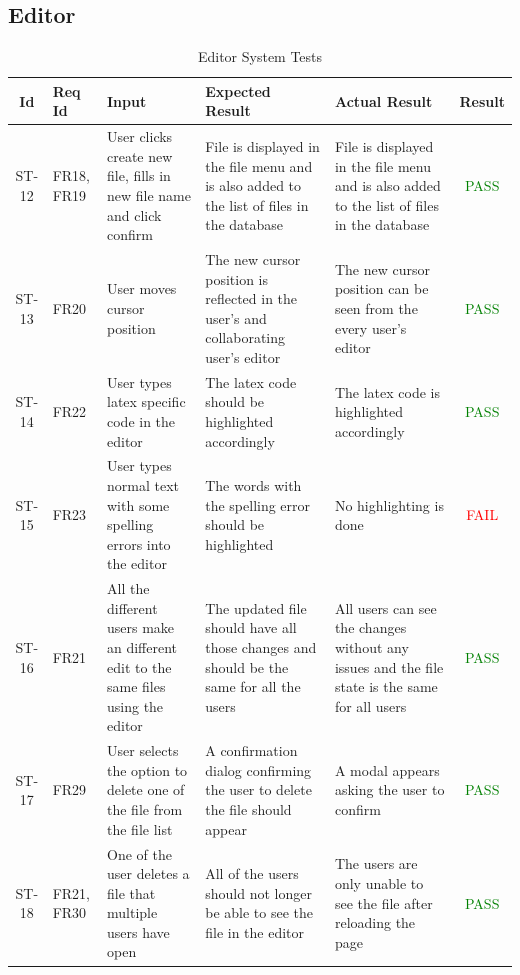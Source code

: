 \documentclass[12pt, titlepage]{article}
\begin{document}
	\subsection{Editor}
	
	\begin{center}
		\begin{longtable}{|c|p{1cm}|p{2.7cm}|p{3cm}|p{3cm}|c|}
			\caption{Editor System Tests \label{long}}\\
			\hline
			\textbf{Id} & \textbf{Req Id} & \textbf{Input} & \textbf{Expected Result} & \textbf{Actual Result} & \textbf{Result}\\
			\hline
			ST-12 & FR18, FR19 & User clicks create new file, fills in new file name and click confirm & File is displayed in the file menu and is also added to the list of files in the database &  File is displayed in the file menu and is also added to the list of files in the database &  \textcolor{green}{PASS} \\
			\hline
			ST-13 & FR20 & User moves cursor position & The new cursor position is reflected in the user's and collaborating user's editor & The new cursor position can be seen from the every user's editor &  \textcolor{green}{PASS} \\
			\hline
			ST-14 & FR22 & User types latex specific code in the editor & The latex code should be highlighted accordingly & The latex code is highlighted accordingly &  \textcolor{green}{PASS}  \\
			\hline
			ST-15 & FR23 & User types normal text with some spelling errors into the editor & The words with the spelling error should be highlighted & No highlighting is done  &  \textcolor{red}{FAIL} \\
			\hline
			ST-16 & FR21 & All the different users make an different edit to the same files using the editor & The updated file should have all those changes and should be the same for all the users & All users can see the changes without any issues and the file state is the same for all users  &  \textcolor{green}{PASS} \\
			\hline
			ST-17 & FR29 & User selects the option to delete one of the file from the file list & A confirmation dialog confirming the user to delete the file should
			appear &  A modal appears asking the user to confirm &  \textcolor{green}{PASS} \\
			\hline
			ST-18 & FR21, FR30 & One of the user deletes a file that multiple users have open & All of the users should not longer be able to see the file in the editor & The users are only unable to see the file after reloading the page & \textcolor{green}{PASS} \\

\end{longtable}
\end{center}
\end{document}
